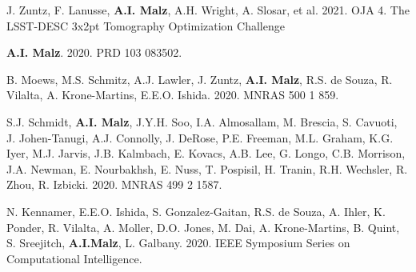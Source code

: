 \begin{etaremune}
\item J. Zuntz, F. Lanusse, \textbf{A.I. Malz}, A.H. Wright, A. Slosar, et al. 2021. OJA 4.  {The LSST-DESC 3x2pt Tomography Optimization Challenge}

\item {\bf A.I. Malz}. 2020. PRD 103 083502. 
	

\item B. Moews, M.S. Schmitz, A.J. Lawler, J. Zuntz, {\bf A.I. Malz}, R.S. de Souza, R. Vilalta, A. Krone-Martins, E.E.O. Ishida. 2020. MNRAS 500 1 859. 
  
\item S.J. Schmidt, {\bf A.I. Malz}, J.Y.H. Soo, %
I.A. Almosallam, M. Brescia, S. Cavuoti, J. Johen-Tanugi, A.J. Connolly, J. DeRose, P.E. Freeman, M.L. Graham, K.G. Iyer, M.J. Jarvis, J.B. Kalmbach, E. Kovacs, A.B. Lee, G. Longo, C.B. Morrison, J.A. Newman, E. Nourbakhsh, E. Nuss, T. Pospisil, H. Tranin, R.H. Wechsler, R. Zhou, R. Izbicki. 
2020. MNRAS 499 2 1587. 

\item N. Kennamer, E.E.O. Ishida, S. Gonzalez-Gaitan, R.S. de Souza, A. Ihler, K. Ponder, R. Vilalta, A. Moller, D.O. Jones, M. Dai, A. Krone-Martins, B. Quint, S. Sreejitch, {\bf A.I.Malz}, L. Galbany. 2020. IEEE Symposium Series on
Computational Intelligence. 


\end{etaremune}
